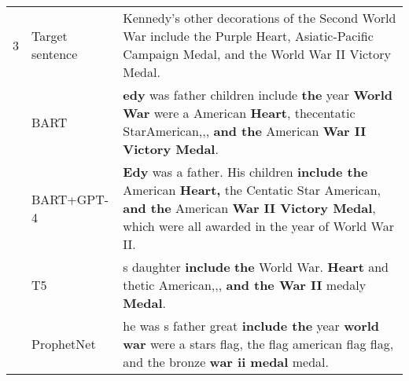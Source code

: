 \documentclass[journal]{IEEEtran}
\begin{document}
\begin{table*}[!htbp]
\begin{tabular}{|p{}|p{}|p{}|}
		3            & Target sentence & Kennedy's other decorations of the Second World War include the Purple Heart, Asiatic-Pacific Campaign Medal, and the World War II Victory Medal.                                                                                                                                                                              \\ \cline{2-3}
		             & BART            & \textbf{edy} was father children include \textbf{the} year \textbf{World War} were a American \textbf{Heart}, thecentatic StarAmerican,,, \textbf{and the} American \textbf{War II Victory Medal}.                                                                                                                             \\ \cline{2-3}
		             & BART+GPT-4      & \textbf{Edy} was a father. His children \textbf{include the} American \textbf{Heart,} the Centatic Star American, \textbf{and the} American \textbf{War II Victory Medal}, which were all awarded in the year of World War II.                                                                                                 \\ \cline{2-3}
		             & T5              & s daughter \textbf{include} \textbf{the} World War. \textbf{Heart} and thetic American,,, \textbf{and the War II} medaly \textbf{Medal}.                                                                                                                                                                                       \\ \cline{2-3}
		             & ProphetNet      & he was s father great \textbf{include the} year \textbf{world war} were a stars flag, the flag american flag flag, and the bronze \textbf{war ii medal} medal.                                                                                                                                                                 \\ \hline
		

\end{tabular}
\end{table*}
\end{document}
